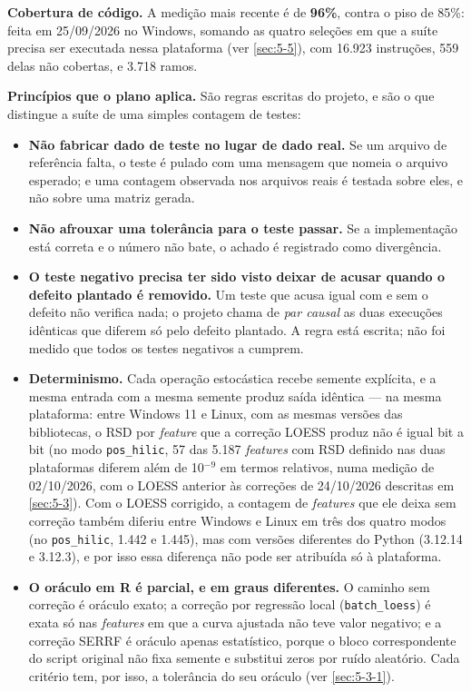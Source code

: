 \textbf{Cobertura de código.} A medição mais recente é de \textbf{96\%}, contra o piso de 85\%: feita em 25/09/2026 no Windows, somando as quatro seleções em que a suíte precisa ser executada nessa plataforma (ver \ref{sec:5-5}), com 16.923 instruções, 559 delas não cobertas, e 3.718 ramos.


\textbf{Princípios que o plano aplica.} São regras escritas do projeto, e são o que distingue a suíte de uma simples contagem de testes:

\begin{itemize}
\item \textbf{Não fabricar dado de teste no lugar de dado real.} Se um arquivo de referência falta, o teste é pulado com uma mensagem que nomeia o arquivo esperado; e uma contagem observada nos arquivos reais é testada sobre eles, e não sobre uma matriz gerada.
\item \textbf{Não afrouxar uma tolerância para o teste passar.} Se a implementação está correta e o número não bate, o achado é registrado como divergência.
\item \textbf{O teste negativo precisa ter sido visto deixar de acusar quando o defeito plantado é removido.} Um teste que acusa igual com e sem o defeito não verifica nada; o projeto chama de \textit{par causal} as duas execuções idênticas que diferem só pelo defeito plantado. A regra está escrita; não foi medido que todos os testes negativos a cumprem.
\item \textbf{Determinismo.} Cada operação estocástica recebe semente explícita, e a mesma entrada com a mesma semente produz saída idêntica --- na mesma plataforma: entre Windows 11 e Linux, com as mesmas versões das bibliotecas, o RSD por \textit{feature} que a correção LOESS produz não é igual bit a bit (no modo \texttt{pos\_\allowbreak{}hilic}, 57 das 5.187 \textit{features} com RSD definido nas duas plataformas diferem além de 10$^{-9}$ em termos relativos, numa medição de 02/10/2026, com o LOESS anterior às correções de 24/10/2026 descritas em \ref{sec:5-3}). Com o LOESS corrigido, a contagem de \textit{features} que ele deixa sem correção também diferiu entre Windows e Linux em três dos quatro modos (no \texttt{pos\_\allowbreak{}hilic}, 1.442 e 1.445), mas com versões diferentes do Python (3.12.14 e 3.12.3), e por isso essa diferença não pode ser atribuída só à plataforma.
\item \textbf{O oráculo em R é parcial, e em graus diferentes.} O caminho sem correção é oráculo exato; a correção por regressão local (\texttt{batch\_\allowbreak{}loess}) é exata só nas \textit{features} em que a curva ajustada não teve valor negativo; e a correção SERRF é oráculo apenas estatístico, porque o bloco correspondente do script original não fixa semente e substitui zeros por ruído aleatório. Cada critério tem, por isso, a tolerância do seu oráculo (ver \ref{sec:5-3-1}).
\end{itemize}

